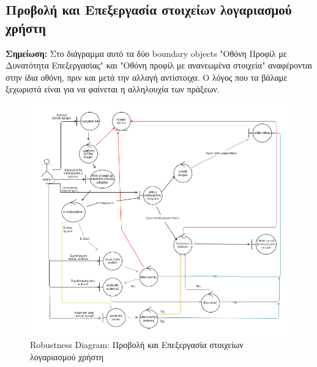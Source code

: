 \documentclass[12pt,a4paper]{article}
\begin{document}
\subsection{Προβολή και Επεξεργασία στοιχείων λογαριασμού χρήστη}
\textbf{Σημείωση:} Στο διάγραμμα αυτό τα δύο boundary objects "Οθόνη Προφίλ με Δυνατότητα Επεξεργασίας" και "Οθόνη προφίλ με ανανεωμένα στοιχεία" αναφέρονται στην ίδια οθόνη, πριν και μετά την αλλαγή αντίστοιχα. Ο λόγος που τα βάλαμε ξεχωριστά είναι για να φαίνεται η αλληλουχία των πράξεων.
\begin{figure}[H]
	\includegraphics[width=\textwidth]{View and Edit User Account Details Robustness.png}
	\caption{Robustness Diagram: Προβολή και Επεξεργασία στοιχείων λογαριασμού χρήστη}
	\label{Robustness Diagram: Προβολή και Επεξεργασία στοιχείων λογαριασμού χρήστη}
\end{figure}
\end{document}
